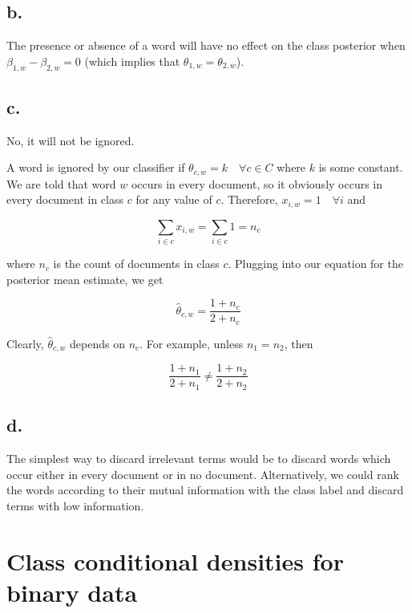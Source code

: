 \documentclass{article}
\begin{document}
\subsection{b.}

The presence or absence of a word will have no effect on the class
posterior when $\beta_{1,w} - \beta_{2,w} = 0$ (which implies that
$\theta_{1,w} = \theta_{2,w}$).

\subsection{c.}

No, it will not be ignored.

A word is ignored by our classifier if
$\theta_{c,w} = k \quad \forall c \in C$ where $k$ is some constant.
We are told that word $w$ occurs in every document, so it obviously
occurs in every document in class $c$ for any value of $c$. Therefore,
$x_{i,w} = 1 \quad \forall i$ and

\begin{equation*}
  \sum_{i \in c} x_{i,w} = \sum_{i \in c} 1 = n_c
\end{equation*}

where $n_c$ is the count of documents in class $c$. Plugging into our
equation for the posterior mean estimate, we get

\begin{equation*}
  \hat{\theta}_{c,w} = \frac{1 + n_c}{2 + n_c}
\end{equation*}

Clearly, $\hat{\theta}_{c,w}$ depends on $n_c$. For example, unless
$n_1 = n_2$, then

\begin{equation*}
  \frac{1 + n_1}{2 + n_1} \neq \frac{1 + n_2}{2 + n_2}
\end{equation*}

\subsection{d.}

The simplest way to discard irrelevant terms would be to discard words
which occur either in every document or in no document. Alternatively,
we could rank the words according to their mutual information with the
class label and discard terms with low information.

\section{Class conditional densities for binary data}
\end{document}
